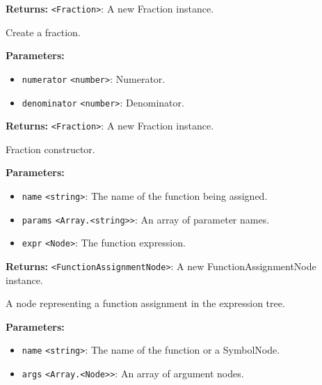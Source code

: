 \documentclass[12pt,a4paper]{article}
\begin{document}
\noindent \textbf{Returns:} \texttt{<Fraction>}: A new Fraction instance.

\noindent Create a fraction.

\vspace{5mm}
\noindent {}


\noindent \textbf{Parameters:}
\begin{itemize}
  \item \texttt{numerator} \texttt{<number>}: Numerator.
  \item \texttt{denominator} \texttt{<number>}: Denominator.
\end{itemize}

\noindent \textbf{Returns:} \texttt{<Fraction>}: A new Fraction instance.

\noindent Fraction constructor.

\vspace{5mm}
\noindent {}


\noindent \textbf{Parameters:}
\begin{itemize}
  \item \texttt{name} \texttt{<string>}: The name of the function being assigned.
  \item \texttt{params} \texttt{<Array.<string>>}: An array of parameter names.
  \item \texttt{expr} \texttt{<Node>}: The function expression.
\end{itemize}

\noindent \textbf{Returns:} \texttt{<FunctionAssignmentNode>}: A new FunctionAssignmentNode instance.

\noindent A node representing a function assignment in the expression tree.

\vspace{5mm}
\noindent {}


\noindent \textbf{Parameters:}
\begin{itemize}
  \item \texttt{name} \texttt{<string>}: The name of the function or a SymbolNode.
  \item \texttt{args} \texttt{<Array.<Node>>}: An array of argument nodes.
\end{itemize}
\end{document}
